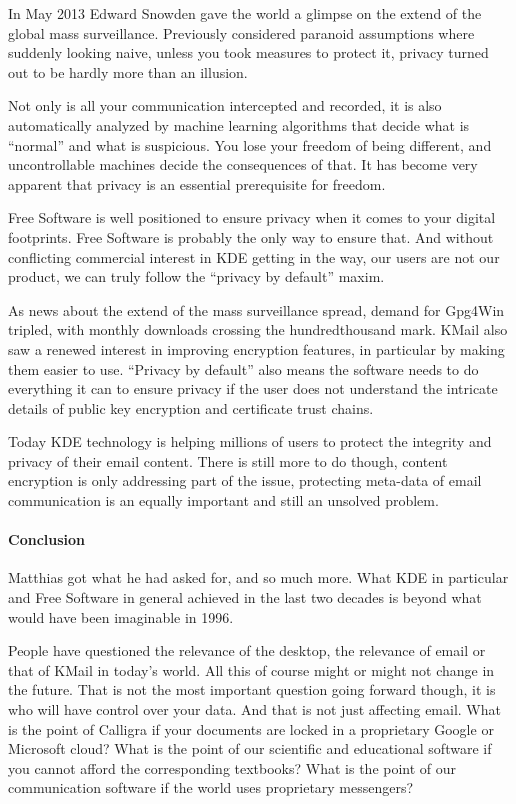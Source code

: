 In May 2013 Edward Snowden gave the world a glimpse on the extend of the global mass surveillance. Previously considered paranoid assumptions where suddenly looking naive, unless you took measures to protect it, privacy turned out to be hardly more than an illusion.

Not only is all your communication intercepted and recorded, it is also automatically analyzed by machine learning algorithms that decide what is “normal” and what is suspicious. You lose your freedom of being different, and uncontrollable machines decide the consequences of that. It has become very apparent that privacy is an essential prerequisite for freedom.

Free Software is well positioned to ensure privacy when it comes to your digital footprints. Free Software is probably the only way to ensure that. And without conflicting commercial interest in KDE getting in the way, our users are not our product, we can truly follow the “privacy by default” maxim.

As news about the extend of the mass surveillance spread, demand for Gpg4Win tripled, with monthly downloads crossing the hundredthousand mark. KMail also saw a renewed interest in improving encryption features, in particular by making them easier to use. “Privacy by default” also means the software needs to do everything it can to ensure privacy if the user does not understand the intricate details of public key encryption and certificate trust chains.

Today KDE technology is helping millions of users to protect the integrity and privacy of their email content. There is still more to do though, content encryption is only addressing part of the issue, protecting meta-data of email communication is an equally important and still an unsolved problem.

\paragraph{Conclusion}

Matthias got what he had asked for, and so much more. What KDE in particular and Free Software in general achieved in the last two decades is beyond what would have been imaginable in 1996.

People have questioned the relevance of the desktop, the relevance of email or that of KMail in today's world. All this of course might or might not change in the future. That is not the most important question going forward though, it is who will have control over your data. And that is not just affecting email. What is the point of Calligra if your documents are locked in a proprietary Google or Microsoft cloud? What is the point of our scientific and educational software if you cannot afford the corresponding textbooks? What is the point of our communication software if the world uses proprietary messengers?

